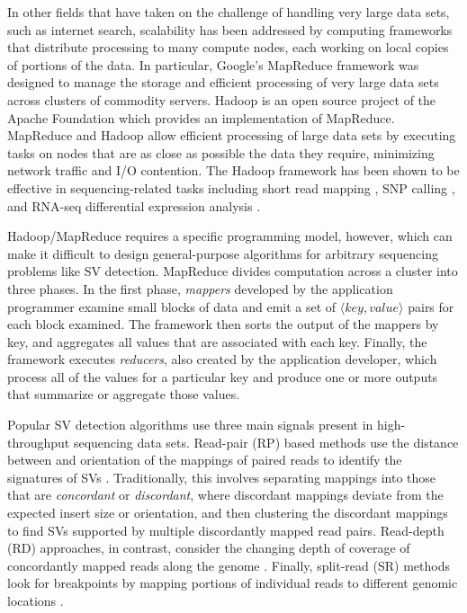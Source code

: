 \documentclass[10pt]{bmc_article}
\newenvironment{bmcformat}{\fussy\setboolean{publ}{true}}{\fussy}
\begin{document}
\begin{bmcformat}
In other fields that have taken on the challenge of handling very large data sets, such as internet search, scalability has been addressed by computing frameworks that distribute processing to many compute nodes, each working on local copies of portions of the data. In particular, Google's MapReduce \cite{Dean:2008p277} framework was designed to manage the storage and efficient processing of very large data sets across clusters of commodity servers. Hadoop is an open source project of the Apache Foundation which provides an implementation of MapReduce. MapReduce and Hadoop allow efficient processing of large data sets by executing tasks on nodes that are as close as possible the data they require, minimizing network traffic and I/O contention. The Hadoop framework has been shown to be effective in sequencing-related tasks including short read mapping \cite{Schatz:2009p278}, SNP calling \cite{Langmead:2009p1225}, and RNA-seq differential expression analysis \cite{Langmead:2010p1268}.

Hadoop/MapReduce requires a specific programming model, however, which can make it difficult to design general-purpose algorithms for arbitrary sequencing problems like SV detection. MapReduce divides computation across a cluster into three phases. In the first phase, \emph{mappers} developed by the application programmer examine small blocks of data and emit a set of $\langle key, value \rangle$ pairs for each block examined. The framework then sorts the output of the mappers by key, and aggregates all values that are associated with each key. Finally, the framework executes \emph{reducers}, also created by the application developer, which process all of the values for a particular key and produce one or more outputs that summarize or aggregate those values.

Popular SV detection algorithms use three main signals present in high-throughput sequencing data sets\cite{Alkan:2011p547}. Read-pair (RP) based methods use the distance between and orientation of the mappings of paired reads to identify the signatures of SVs \cite{Campbell:2008p539,Chen:2009p3,Hormozdiari:2009p284,Sindi:2009gu,Korbel:2009dy}. Traditionally, this involves separating mappings into those that are \emph{concordant} or \emph{discordant}, where discordant mappings deviate from the expected insert size or orientation, and then clustering the discordant mappings to find SVs supported by multiple discordantly mapped read pairs. Read-depth (RD) approaches, in contrast, consider the changing depth of coverage of concordantly mapped reads along the genome \cite{Abyzov:2011bk,Alkan:2009cr,Yoon:2009kb,Chiang:2009di}. Finally, split-read (SR) methods look for breakpoints by mapping portions of individual reads to different genomic locations \cite{Wang:2011p1607,Ye:2009p2}.


\end{bmcformat}
\end{document}
